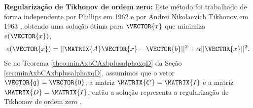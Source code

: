 \begin{tcbinformation} 
\textbf{Regularização de Tikhonov de ordem zero:} Este método foi trabalhado de forma independente
por Phillips em 1962 e por Andrei Nikolaevich Tikhonov em 1963 \cite[pp. 86]{kress2012numerical}, 
obtendo uma solução ótima para $\VECTOR{x}$  que minimiza $e(\VECTOR{x})$, 
\begin{equation}
e(\VECTOR{x})=||\MATRIX{A}\VECTOR{x}-\VECTOR{b}||^2+\alpha ||\VECTOR{x}||^2.
\end{equation}
Se no Teorema \ref{theo:minAxbCAxbplusalphaxqD} da  Seção \ref{sec:minAxbCAxbplusalphaxqD},
assumimos que o vetor $\VECTOR{q}=\VECTOR{0}$, a matriz $\MATRIX{C}=\MATRIX{I}$ e 
a matriz $\MATRIX{D}=\MATRIX{I}$,
então a solução representa a regularização de Tikhonov de ordem zero
\cite[pp. 94]{aster2013parameter} \cite[pp. 86]{kress2012numerical} \cite[pp. 117]{engl2000regularization}.
\end{tcbinformation} 

